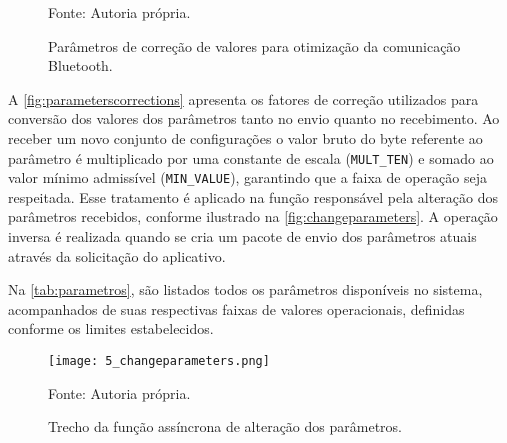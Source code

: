 \begin{figure}[ht]
    \caption{Parâmetros de correção de valores para otimização da comunicação Bluetooth.}
    \label{fig:parameterscorrections}
    \centering
    \hfill
    \hfill

    {\centering\footnotesize Fonte: Autoria própria.\par}

\end{figure}

A \autoref{fig:parameterscorrections} apresenta os fatores de correção utilizados para conversão dos valores dos parâmetros tanto no envio quanto no recebimento. Ao receber um novo conjunto de configurações o valor bruto do byte referente ao parâmetro é multiplicado por uma constante de escala (\texttt{MULT\_TEN}) e somado ao valor mínimo admissível (\texttt{MIN\_VALUE}), garantindo que a faixa de operação seja respeitada. Esse tratamento é aplicado na função responsável pela alteração dos parâmetros recebidos, conforme ilustrado na \autoref{fig:changeparameters}. A operação inversa é realizada quando se cria um pacote de envio dos parâmetros atuais através da solicitação do aplicativo.

Na \autoref{tab:parametros}, são listados todos os parâmetros disponíveis no sistema, acompanhados de suas respectivas faixas de valores operacionais, definidas conforme os limites estabelecidos.

\begin{figure}[ht]
    \centering
    \caption{Trecho da função assíncrona de alteração dos parâmetros.}
    \label{fig:changeparameters}
    \texttt{[image: 5\_changeparameters.png]}

    {\centering\footnotesize Fonte: Autoria própria.\par}
\end{figure}

